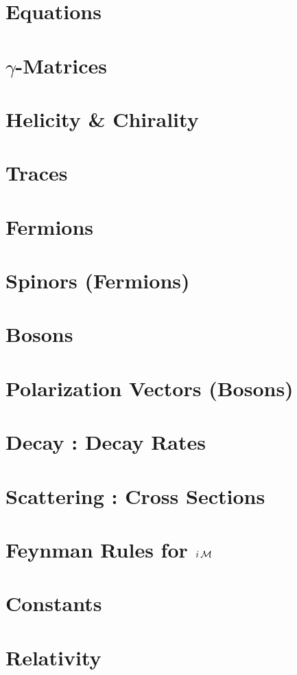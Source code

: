 \documentclass[landscape,8pt,a4paper,english]{extarticle}
\begin{document}
\begin{multicols*}{3}\centering
        \section*{Equations}
        \section*{$\gamma$-Matrices}
        \section*{Helicity \& Chirality}
        \section*{Traces}
        \section*{Fermions}
        \section*{Spinors (Fermions)}
        \section*{Bosons}
        \section*{Polarization Vectors (Bosons)}
        \section*{Decay : Decay Rates}
        \section*{Scattering : Cross Sections}
        \section*{Feynman Rules for $i\operatorname{\mathcal{M}}$}
        \section*{Constants}
        \section*{Relativity}
\end{multicols*}
\end{document}

